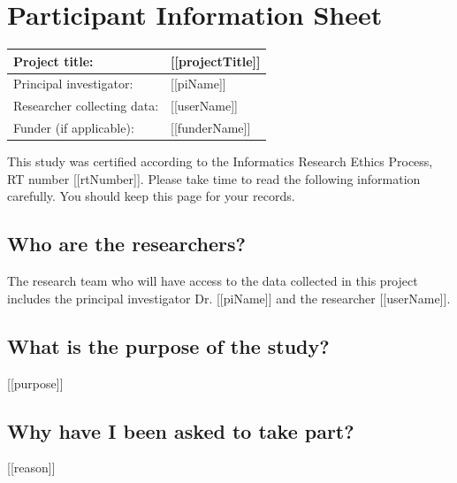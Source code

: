 \documentclass{article}
\begin{document}
\begingroup
\thispagestyle{empty}
\raggedleft
\vspace*{0.5cm}
\endgroup

\noindent
\section*{Participant Information Sheet}
\begin{table}[h]
\begin{tabular}[width=0.6\textwidth]{|l|l|}
\hline
Project title:              & [[projectTitle]]\hspace{9.5cm} \\ \hline
Principal investigator:     & [[piName]] \\ \hline
Researcher collecting data: & [[userName]] \\ \hline
Funder (if applicable):      & [[funderName]] \\ \hline
\end{tabular}
\end{table}
This study was certified according to the Informatics Research Ethics Process, RT number [[rtNumber]]. Please take time to read the following information carefully. You should keep this page for your records. 
\subsection*{Who are the researchers?}
The research team who will have access to the data collected in this project includes the principal investigator Dr. [[piName]] and the researcher [[userName]].
\subsection*{What is the purpose of the study?}
[[purpose]]
\subsection*{Why have I been asked to take part?}
[[reason]]
\end{document}
